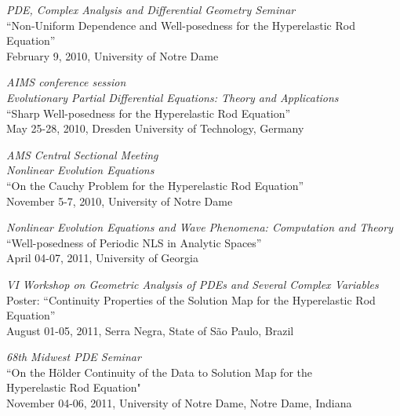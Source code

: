 \documentclass[11pt,oneside]{amsart}
\renewcommand{\section}[2]%
{\vspace{0.7cm}%
\hspace{0in}%
\marginpar{\scshape #1}#2}
\begin{document}
\section{Invited Talks}
\vspace{-0.4cm}
\begin{compactenum}[1)]
\item \textit{PDE, Complex Analysis and Differential Geometry Seminar} \\
``Non-Uniform Dependence and Well-posedness for the Hyperelastic Rod Equation'' \\
February 9, 2010, University of 
Notre Dame
\\
\item \textit{AIMS conference session \\ 
Evolutionary Partial Differential Equations: Theory and Applications} \\
``Sharp Well-posedness for the Hyperelastic Rod Equation''\\ 
May 25-28, 2010, Dresden University of Technology, Germany  \\

\item \textit{AMS Central Sectional Meeting \\ Nonlinear Evolution Equations} \\
``On the Cauchy Problem for the Hyperelastic Rod Equation'' \\
November 5-7, 2010, University of Notre Dame \\

\item \textit{Nonlinear Evolution Equations and Wave Phenomena: Computation and Theory} \\
``Well-posedness of Periodic NLS in Analytic Spaces'' \\
April 04-07, 2011, University of Georgia \\

\item \textit{VI Workshop on Geometric Analysis of PDEs and Several Complex Variables}
\\
Poster: ``Continuity Properties of the Solution Map for the Hyperelastic Rod Equation''
\\
August 01-05, 2011, Serra Negra, State of S{\~a}o Paulo, Brazil \\

\item \textit{68th Midwest PDE Seminar}
\\
``On the H\"older Continuity of the Data to Solution Map for the \\ Hyperelastic
Rod Equation"
\\
November 04-06, 2011, University of Notre Dame, Notre Dame, Indiana \\
\end{compactenum}
\end{document}
